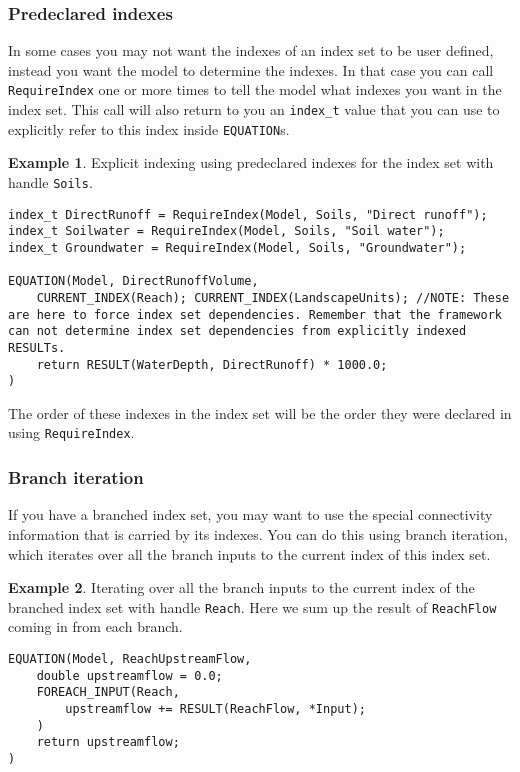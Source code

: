 \documentclass[11pt]{article}
\theoremstyle{definition}
\newtheorem{myexample}{Example}
\newenvironment{example}%
  {\begin{lrbox}{\examplebox}%
   \begin{minipage}{\dimexpr\linewidth-2\fboxsep}
   \begin{myexample}}%
  {\end{myexample}%
   \end{minipage}%
   \end{lrbox}%
   \begin{trivlist}
     \item[]\colorbox{silver}{\usebox\examplebox}
   \end{trivlist}}
\begin{document}
\subsubsection{Predeclared indexes}

In some cases you may not want the indexes of an index set to be user defined, instead you want the model to determine the indexes. In that case you can call {\tt RequireIndex} one or more times to tell the model what indexes you want in the index set. This call will also return to you an {\tt index\_t} value that you can use to explicitly refer to this index inside {\tt EQUATION}s.

\begin{example}
Explicit indexing using predeclared indexes for the index set with handle {\tt Soils}.
\begin{lstlisting}[style=mycpp]
index_t DirectRunoff = RequireIndex(Model, Soils, "Direct runoff");
index_t Soilwater = RequireIndex(Model, Soils, "Soil water");
index_t Groundwater = RequireIndex(Model, Soils, "Groundwater");

EQUATION(Model, DirectRunoffVolume,
	CURRENT_INDEX(Reach); CURRENT_INDEX(LandscapeUnits); //NOTE: These are here to force index set dependencies. Remember that the framework can not determine index set dependencies from explicitly indexed RESULTs.
	return RESULT(WaterDepth, DirectRunoff) * 1000.0;
)
\end{lstlisting}
\end{example}

The order of these indexes in the index set will be the order they were declared in using {\tt RequireIndex}.

\subsubsection{Branch iteration}

If you have a branched index set, you may want to use the special connectivity information that is carried by its indexes. You can do this using branch iteration, which iterates over all the branch inputs to the current index of this index set.

\begin{example}
Iterating over all the branch inputs to the current index of the branched index set with handle {\tt Reach}. Here we sum up the result of {\tt ReachFlow} coming in from each branch.
\begin{lstlisting}[style=mycpp]
EQUATION(Model, ReachUpstreamFlow,
	double upstreamflow = 0.0;
	FOREACH_INPUT(Reach,
		upstreamflow += RESULT(ReachFlow, *Input);
	)
	return upstreamflow;
)
\end{lstlisting}
\end{example}
\end{document}
